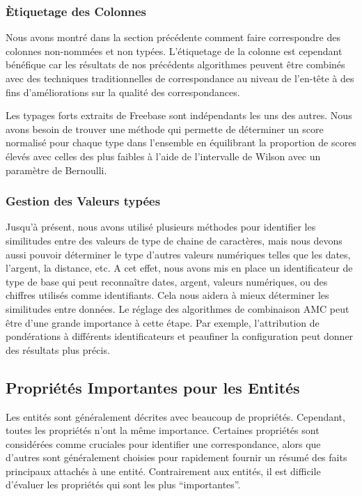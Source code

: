 \subsubsection{\`{E}tiquetage des Colonnes}

Nous avons montr\'{e} dans la section pr\'{e}c\'{e}dente comment faire correspondre des colonnes non-nomm\'{e}es et non typ\'{e}es. L'\'{e}tiquetage de la colonne est cependant b\'{e}n\'{e}fique car les r\'{e}sultats de nos pr\'{e}c\'{e}dents algorithmes peuvent \^{e}tre combin\'{e}s avec des techniques traditionnelles de correspondance au niveau de l'en-t\^{e}te \`{a} des fins d'am\'{e}liorations sur la qualit\'{e} des correspondances.

Les typages forts extraits de Freebase sont ind\'{e}pendants les uns des autres. Nous avons besoin de trouver une m\'{e}thode qui permette de d\'{e}terminer un score normalis\'{e} pour chaque type dans l'ensemble en \'{e}quilibrant la proportion de scores \'{e}lev\'{e}s avec celles des plus faibles \`{a} l'aide de l'intervalle de Wilson avec un param\`{e}tre de Bernoulli.

\subsubsection{Gestion des Valeurs typ\'{e}es}

Jusqu'\`{a} pr\'{e}sent, nous avons utilis\'{e} plusieurs m\'{e}thodes pour identifier les similitudes entre des valeurs de type de chaine de caract\`{e}res, mais nous devons aussi pouvoir d\'{e}terminer le type d'autres valeurs num\'{e}riques telles que les dates, l'argent, la distance, etc. A cet effet, nous avons mis en place un identificateur de type de base qui peut reconnaître dates, argent, valeurs num\'{e}riques, ou des chiffres utilis\'{e}s comme identifiants. Cela nous aidera \`{a} mieux d\'{e}terminer les similitudes entre donn\'{e}es. Le r\'{e}glage des algorithmes de combinaison AMC peut \^{e}tre d'une grande importance \`{a} cette \'{e}tape. Par exemple, l'attribution de pond\'{e}rations \`{a} diff\'{e}rents identificateurs et peaufiner la configuration peut donner des r\'{e}sultats plus pr\'{e}cis.

\subsection{Propri\'{e}t\'{e}s Importantes pour les Entit\'{e}s}

Les entit\'{e}s sont g\'{e}n\'{e}ralement d\'{e}crites avec beaucoup de propri\'{e}t\'{e}s. Cependant, toutes les propri\'{e}t\'{e}s n'ont la m\^{e}me importance. Certaines propri\'{e}t\'{e}s sont consid\'{e}r\'{e}es comme cruciales pour identifier une correspondance, alors que d'autres sont g\'{e}n\'{e}ralement choisies pour rapidement fournir un r\'{e}sum\'{e} des faits principaux attach\'{e}s \`{a} une entit\'{e}. Contrairement aux entit\'{e}s, il est difficile d'\'{e}valuer les propri\'{e}t\'{e}s qui sont les plus ``importantes''.

